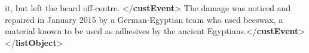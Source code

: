 \begin{shaded}
\hspace*{1em}\hspace*{1em}\hspace*{1em}\hspace*{1em}\hspace*{1em}\hspace*{1em}\hspace*{1em}\hspace*{1em}\hspace*{1em}\hspace*{1em} it, but left the beard off-centre. {</\textbf{custEvent}>}\mbox{}\newline 
\hspace*{1em}\hspace*{1em}\hspace*{1em}\hspace*{1em}The damage was noticed and repaired in January 2015 by a German-Egyptian team who\mbox{}\newline 
\hspace*{1em}\hspace*{1em}\hspace*{1em}\hspace*{1em}\hspace*{1em}\hspace*{1em}\hspace*{1em}\hspace*{1em}\hspace*{1em}\hspace*{1em} used beeswax, a material known to be used as adhesives by the ancient Egyptians.{</\textbf{custEvent}>}\mbox{}\newline 
\hspace*{1em}\hspace*{1em}\hspace*{1em}\mbox{}\newline 
\hspace*{1em}\hspace*{1em}\mbox{}\newline 
\hspace*{1em}\mbox{}\newline 
{}\mbox{}\newline 
{</\textbf{listObject}>}\end{shaded}\egroup\par \par
